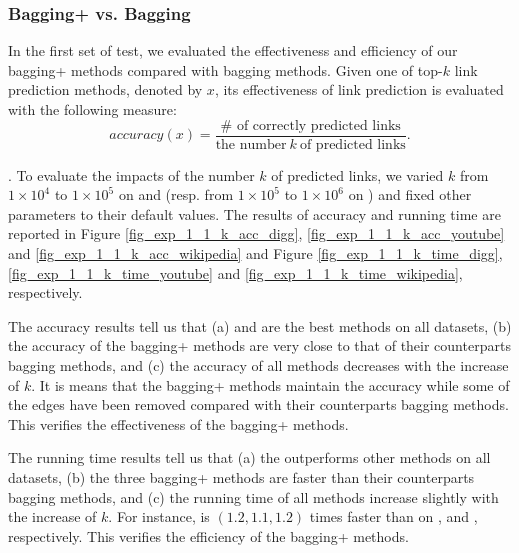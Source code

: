 \subsubsection{Bagging+ vs. Bagging}
In the first set of test, we evaluated the effectiveness and efficiency of our bagging+ methods
compared with bagging methods. Given one of top-$k$ link prediction methods, denoted by $x$, its effectiveness
of link prediction is evaluated with the following measure:
\begin{equation}
accuracy(x) = \frac{\# \textrm{ of correctly predicted links}}{\textrm{the number} \ k\ \textrm{of predicted links}}.
\end{equation}


. To evaluate the impacts of the number $k$ of
predicted links, we varied $k$ from $1\times 10^4$ to $1\times 10^5$ on \Digg
and \YouTube (resp. from $1\times 10^5$ to $1\times 10^6$ on \Wikipedia)
and fixed other parameters to their default values.
The results of accuracy and running time are reported in Figure \ref{fig_exp_1_1_k_acc_digg},
\ref{fig_exp_1_1_k_acc_youtube} and \ref{fig_exp_1_1_k_acc_wikipedia}
and Figure \ref{fig_exp_1_1_k_time_digg}, \ref{fig_exp_1_1_k_time_youtube} and
\ref{fig_exp_1_1_k_time_wikipedia}, respectively.


The accuracy results tell us that
(a) \Biased and \Biasedp are the best methods on all datasets,
(b) the accuracy of the bagging+ methods are very close to that 
of their counterparts bagging methods, and (c) the accuracy of all
methods decreases with the increase of $k$. It is means that the
bagging+ methods maintain the accuracy while some of the
edges have been removed compared with their counterparts bagging methods.
This verifies the effectiveness of the bagging+ methods.


The running time results tell us that (a) the \Biasedp outperforms
other methods on all datasets, (b) the three bagging+ methods are faster
than their counterparts bagging methods, and (c) the running time of all
methods increase slightly with the increase of $k$. For instance,
\Biasedp is $(1.2, 1.1, 1.2)$ times faster than
\Biased on \Digg, \YouTube and \Wikipedia, respectively.
This verifies the efficiency of the bagging+ methods.








